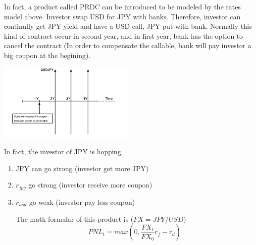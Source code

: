 In fact, a product called PRDC can be introduced to be modeled by the rates model above. Investor swap USD for JPY with banks. Therefore, investor can continully get JPY yield and have a USD call, JPY put with bank. Normally this kind of contract occur in second year, and in first year, bank has the option to cancel the contract (In order to compensate the callable, bank will pay investor a big coupon at the begining).
\begin{center}
\includegraphics[width=0.5\textwidth]{pictures/PRDC.png}
\end{center}
In fact, the investor of JPY is hopping
\begin{enumerate}
   \item JPY can go strong (investor get more JPY)
   \item $r_{jpy}$ go strong (investor receive more coupon)
   \item $r_{usd}$ go weak (investor pay less coupon)

The math formular of this product is ($FX = JPY/USD$)
\begin{equation}
  PNL_t = max(0, \frac{FX_t}{FX_0}r_f - r_d)
\end{equation}

\end{enumerate}
